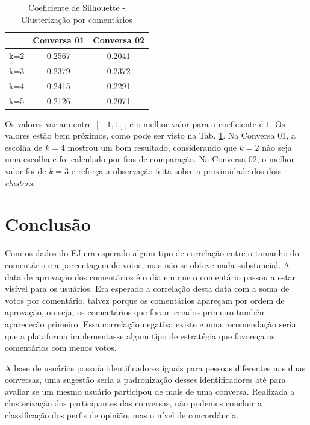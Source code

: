 \begin{table}[!h]
\centering
\label{tab:silhouette} 
\begin{tabular}{|c|c|c|}
\hline
    & \textbf{Conversa 01} & \textbf{Conversa 02} \\ \hline
k=2 & 0.2567               & 0.2041               \\ \hline
k=3 & 0.2379               & 0.2372               \\ \hline
k=4 & 0.2415               & 0.2291               \\ \hline
k=5 & 0.2126               & 0.2071               \\ \hline
\end{tabular}
\caption{Coeficiente de Silhouette - Clusterização por comentários}
\end{table}

Os valores variam entre $[-1,1]$, e o melhor valor para o coeficiente é $1$. Os valores estão bem próximos, como pode ser visto na Tab. \ref{tab:silhouette}. Na Conversa 01, a escolha de $k=4$ mostrou um bom resultado, considerando que $k=2$ não seja uma escolha e foi calculado por fins de comparação. Na Conversa 02, o melhor valor foi de $k=3$ e reforça a observação feita sobre a proximidade dos dois \textit{clusters}.


\chapter{Conclusão}
\label{chap:conclusao}


Com os dados do EJ era esperado algum tipo de correlação entre o tamanho do comentário e a porcentagem de votos, mas não se obteve nada substancial. 
A data de aprovação dos comentários é o dia em que o comentário passou a estar visível para os usuários. Era esperado a correlação desta data com a soma de votos por comentário, talvez porque os comentários apareçam por ordem de aprovação, ou seja, os comentários que foram criados primeiro também aparecerão primeiro. Essa correlação negativa existe e uma recomendação seria que a plataforma implementasse algum tipo de estratégia que favoreça os comentários com menos votos. 

A base de usuários possuía identificadores iguais para pessoas diferentes nas duas conversas, uma sugestão seria a padronização desses identificadores até para avaliar se um mesmo usuário participou de mais de uma conversa. Realizada a clusterização dos participantes das conversas, não podemos concluir a classificação dos perfis de opinião, mas o nível de concordância. 


